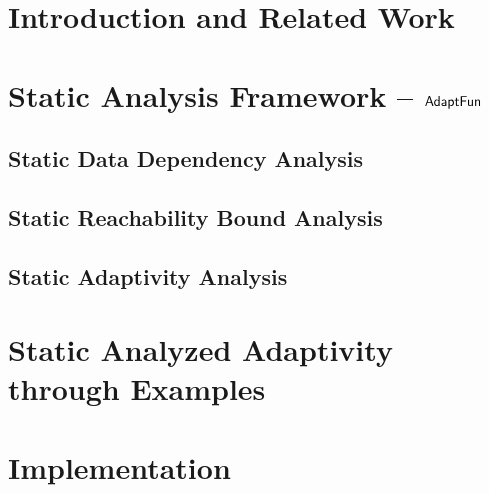 
\section{Introduction and Related Work}
\label{sec:static-intro}


\section{Static Analysis Framework -- $\textsf{AdaptFun}$}
\label{sec:static-adapfun}


\subsection{Static Data Dependency Analysis}
\label{subsec:static-datadep}


\subsection{Static Reachability Bound Analysis}
\label{subsec:static-reachability}


\subsection{Static Adaptivity Analysis}
\label{subsec:static-adapt}


\section{Static Analyzed Adaptivity through Examples}
\label{sec:static-examples}
%
\section{Implementation}
\label{sec:static-implementation}

